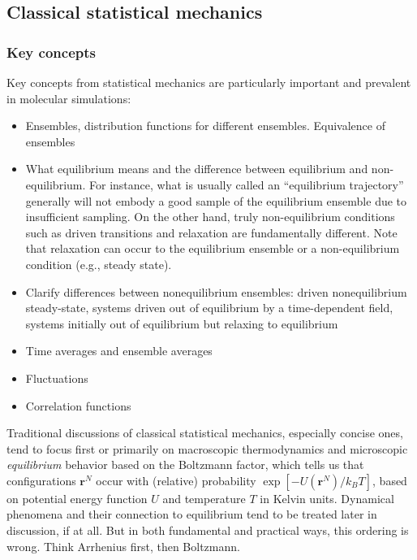 \documentclass[9pt,bestpractices]{livecoms}
\newcommand{\conf}{\mathbf{r}^N}
\begin{document}

\subsection{Classical statistical mechanics}
\label{sec:stat_mech}
\subsubsection{Key concepts}
Key concepts from statistical mechanics are particularly important and prevalent in molecular simulations:
\begin{itemize}
\item Ensembles, distribution functions for different ensembles. Equivalence of ensembles
\item What equilibrium means and the difference between equilibrium and non-equilibrium.
    For instance, what is usually called an ``equilibrium trajectory'' generally will not embody a good sample of the equilibrium ensemble due to insufficient sampling.  
        On the other hand, truly non-equilibrium conditions such as driven transitions and relaxation are fundamentally different. 
        Note that relaxation can occur to the equilibrium ensemble or a non-equilibrium condition (e.g., steady state).
\item Clarify differences between nonequilibrium ensembles: driven
    nonequilibrium steady-state, systems driven out of equilibrium by a time-dependent field, systems initially out of equilibrium but relaxing
        to equilibrium
\item Time averages and ensemble averages
\item Fluctuations
\item Correlation functions
\end{itemize}

Traditional discussions of classical statistical mechanics, especially concise ones, tend to focus first or primarily on macroscopic thermodynamics and microscopic \emph{equilibrium} behavior based on the Boltzmann factor, which tells us that configurations $\conf$ occur with (relative) probability $\exp[-U(\conf)/k_B T]$, based on potential energy function $U$ and temperature $T$ in Kelvin units.  
Dynamical phenomena and their connection to equilibrium tend to be treated later in discussion, if at all.  
But in both fundamental and practical ways, this ordering is wrong.  
Think Arrhenius first, then Boltzmann.
\end{document}
